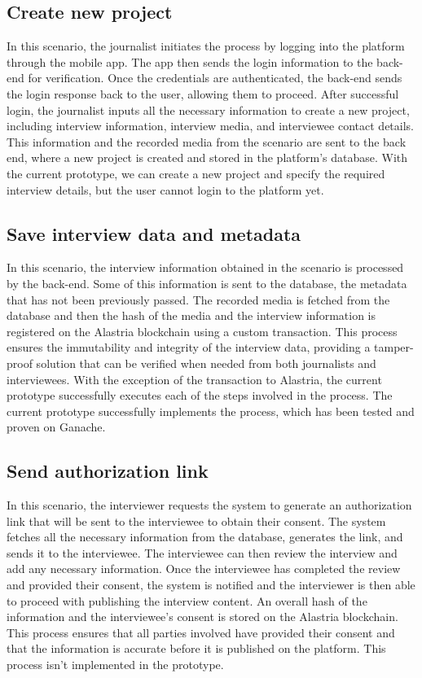 \documentclass[target=mst,aauheader=]{thud}
\begin{document}
\subsection{Create new project}
\label{createNewProject}

In this scenario, the journalist initiates the process by logging into the platform through the mobile app. The app then sends the login information to the back-end for verification. Once the credentials are authenticated, the back-end sends the login response back to the user, allowing them to proceed. After successful login, the journalist inputs all the necessary information to create a new project, including interview information, interview media, and interviewee contact details. 
This information and the recorded media from the  scenario are sent to the back end, where a new project is created and stored in the platform’s database. With the current prototype, we can create a new project and specify the required interview details, but the user cannot login to the platform yet.

\subsection{Save interview data and metadata}
\label{saveDataAndMetadata}

In this scenario, the interview information obtained in the  scenario is processed by the back-end. Some of this information is sent to the database, the metadata that has not been previously passed. The recorded media is fetched from the database and then the hash of the media and the interview information is registered on the Alastria blockchain using a custom transaction. This process ensures the immutability and integrity of the interview data, providing a tamper-proof solution that can be verified when needed from both journalists and interviewees. With the exception of the transaction to Alastria, the current prototype successfully executes each of the steps involved in the process. The current prototype successfully implements the process, which has been tested and proven on Ganache.

\subsection{Send authorization link}
\label{generateAndSendLink}

In this scenario, the interviewer requests the system to generate an authorization link that will be sent to the interviewee to obtain their consent. The system fetches all the necessary information from the database, generates the link, and sends it to the interviewee. The interviewee can then review the interview and add any necessary information. Once the interviewee has completed the review and provided their consent, the system is notified and the interviewer is then able to proceed with publishing the interview content. An overall hash of the information and the interviewee's consent is stored on the Alastria blockchain. This process ensures that all parties involved have provided their consent and that the information is accurate before it is published on the platform. This process isn't implemented in the prototype.
\end{document}
